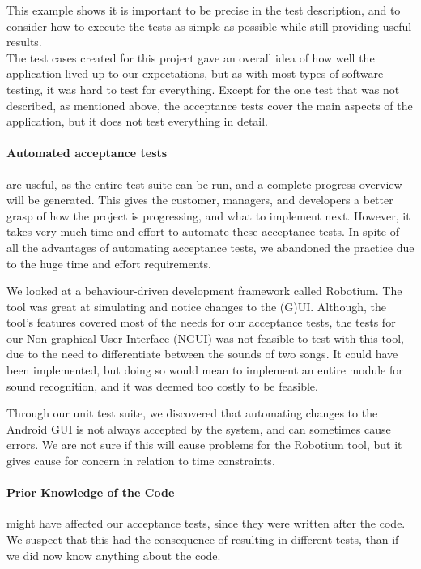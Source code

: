 This example shows it is important to be precise in the test description, and to consider how to execute the tests as simple as possible while still providing useful results.\\

The test cases created for this project gave an overall idea of how well the application lived up to our expectations, but as with most types of software testing, it was hard to test for everything.
Except for the one test that was not described, as mentioned above, the acceptance tests cover the main aspects of the application, but it does not test everything in detail. 

\paragraph{Automated acceptance tests} are useful, as the entire test suite can be run, and a complete progress overview will be generated.
This gives the customer, managers, and developers a better grasp of how the project is progressing, and what to implement next.
However, it takes very much time and effort to automate these acceptance tests.
In spite of all the advantages of automating acceptance tests, we abandoned the practice due to the huge time and effort requirements.

We looked at a behaviour-driven development framework called Robotium.
The tool was great at simulating and notice changes to the (G)UI.
Although, the tool's features covered most of the needs for our acceptance tests, the tests for our Non-graphical User Interface (NGUI) was not feasible to test with this tool, due to the need to differentiate between the sounds of two songs.
It could have been implemented, but doing so would mean to implement an entire module for sound recognition, and it was deemed too costly to be feasible. 

Through our unit test suite, we discovered that automating changes to the Android GUI is not always accepted by the system, and can sometimes cause errors.
We are not sure if this will cause problems for the Robotium tool, but it gives cause for concern in relation to time constraints.

\paragraph{Prior Knowledge of the Code} might have affected our acceptance tests, since they were written after the code. We suspect that this had the consequence of resulting in different tests, than if we did now know anything about the code. 

